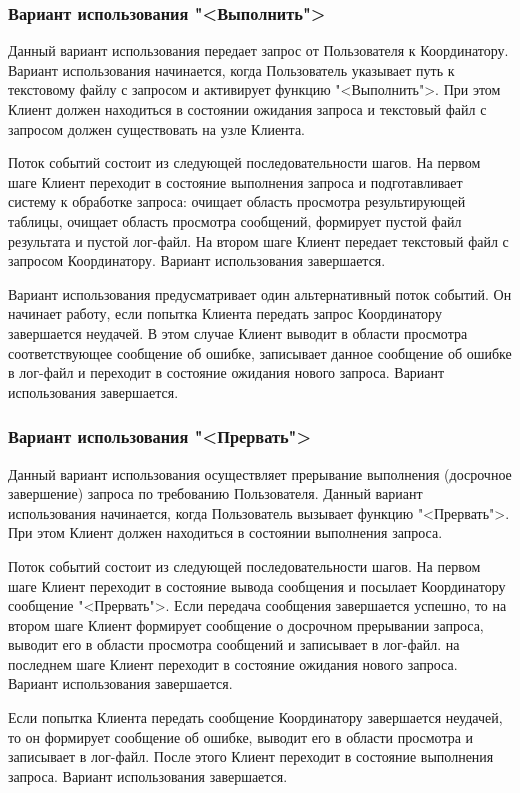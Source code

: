 \documentclass[11pt,oneside]{article}
\begin{document}
	\subsubsection{Вариант использования "<Выполнить">}
	Данный вариант использования передает запрос от Пользователя к Координатору. Вариант использования начинается, когда Пользователь указывает путь к текстовому файлу с запросом и активирует функцию "<Выполнить">. При этом Клиент должен находиться в состоянии ожидания запроса и текстовый файл с запросом должен существовать на узле Клиента.
	\par Поток событий состоит из следующей последовательности шагов. На первом шаге Клиент переходит в состояние выполнения запроса и подготавливает систему к обработке запроса: очищает область просмотра результирующей таблицы, очищает область просмотра сообщений, формирует пустой файл результата и пустой лог-файл. На втором шаге Клиент передает текстовый файл с запросом Координатору. Вариант использования завершается.
	\par Вариант использования предусматривает один альтернативный поток событий. Он начинает работу, если попытка Клиента передать запрос Координатору завершается неудачей. В этом случае Клиент выводит в области просмотра соответствующее сообщение об ошибке, записывает данное сообщение об ошибке в лог-файл и переходит в состояние ожидания нового запроса. Вариант использования завершается.
	
	\subsubsection{Вариант использования "<Прервать">}
	Данный вариант использования осуществляет прерывание выполнения (досрочное завершение) запроса по требованию Пользователя. Данный вариант использования начинается, когда Пользователь вызывает функцию "<Прервать">. При этом Клиент должен находиться в состоянии выполнения запроса.
	\par Поток событий состоит из следующей последовательности шагов. На первом шаге Клиент переходит в состояние вывода сообщения и посылает Координатору сообщение "<Прервать">. Если передача сообщения завершается успешно, то на втором шаге Клиент формирует сообщение о досрочном прерывании запроса, выводит его в области просмотра сообщений и записывает в лог-файл. на последнем шаге Клиент переходит в состояние ожидания нового запроса. Вариант использования завершается.
	\par Если попытка Клиента передать сообщение Координатору завершается неудачей, то он формирует сообщение об ошибке, выводит его в области просмотра и записывает в лог-файл. После этого Клиент переходит в состояние выполнения запроса. Вариант использования завершается.
	
\end{document}
